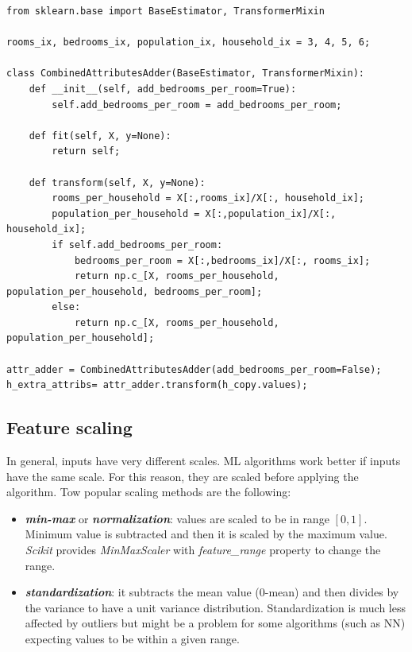 \documentclass[12pt, letterpaper]{article}
\theoremstyle{definition}
\let\ti\textit
\let\tb\textbf
\begin{document}
\begin{lstlisting}[caption=Example of how to create a custom transformer]
from sklearn.base import BaseEstimator, TransformerMixin

rooms_ix, bedrooms_ix, population_ix, household_ix = 3, 4, 5, 6;

class CombinedAttributesAdder(BaseEstimator, TransformerMixin):
    def __init__(self, add_bedrooms_per_room=True):
        self.add_bedrooms_per_room = add_bedrooms_per_room;

    def fit(self, X, y=None):
        return self;
    
    def transform(self, X, y=None):
        rooms_per_household = X[:,rooms_ix]/X[:, household_ix];
        population_per_household = X[:,population_ix]/X[:, household_ix];
        if self.add_bedrooms_per_room:
            bedrooms_per_room = X[:,bedrooms_ix]/X[:, rooms_ix];
            return np.c_[X, rooms_per_household, population_per_household, bedrooms_per_room];
        else:
            return np.c_[X, rooms_per_household, population_per_household];
        
attr_adder = CombinedAttributesAdder(add_bedrooms_per_room=False);
h_extra_attribs= attr_adder.transform(h_copy.values);
\end{lstlisting}

\subsection{Feature scaling}
In general, inputs have very different scales. ML algorithms work better if inputs have the same scale. For this reason, they are scaled before applying the algorithm. Tow popular scaling methods are the following:
\begin{itemize}
\item \ti{\tb{min-max}} or \ti{\tb{normalization}}: values are scaled to be in range $[0,1]$. Minimum value is subtracted and then it is scaled by the maximum value. \ti{Scikit} provides \ti{MinMaxScaler} with \ti{feature\_range} property to change the range.
\item \ti{\tb{standardization}}: it subtracts the mean value (0-mean) and then divides by the variance to have a unit variance distribution. Standardization is much less affected by outliers but might be a problem for some algorithms (such as NN) expecting values to be within a given range.
\end{itemize}
\end{document}
